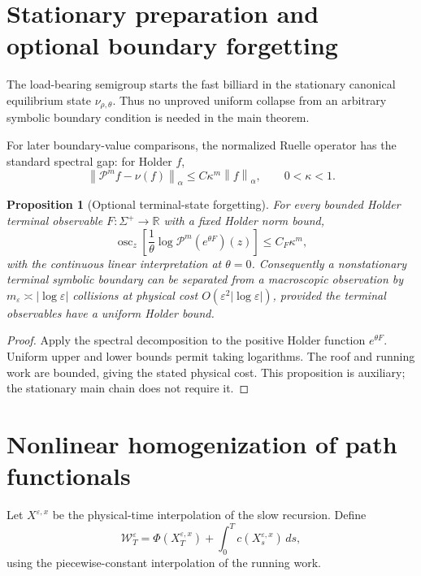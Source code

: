 \documentclass[11pt,reqno]{amsart}
\newtheorem{proposition}[theorem]{Proposition}
\theoremstyle{definition}
\theoremstyle{remark}
\newcommand{\R}{\mathbb R}
\newcommand{\cP}{\mathcal P}
\newcommand{\osc}{\operatorname{osc}}
\newcommand{\norm}[1]{\left\lVert #1\right\rVert}
\begin{document}
\section{Stationary preparation and optional boundary forgetting}\label{sec:fast-collapse}
The load-bearing semigroup starts the fast billiard in the stationary
canonical equilibrium state $\nu_{\rho,\theta}$.  Thus no unproved uniform
collapse from an arbitrary symbolic boundary condition is needed in the main
theorem.

For later boundary-value comparisons, the normalized Ruelle operator has the
standard spectral gap: for Holder $f$,
\[
 \norm{\cP^mf-\nu(f)}_\alpha
 \le C\kappa^m\norm f_\alpha,
 \qquad 0<\kappa<1.
\]

\begin{proposition}[Optional terminal-state forgetting]\label{thm:fast-collapse}
For every bounded Holder terminal observable $F:\Sigma^+\to\R$ with a fixed
Holder norm bound,
\[
 \osc_z\left[\frac1\theta\log\cP^m(e^{\theta F})(z)\right]
 \le C_F\kappa^m,
\]
with the continuous linear interpretation at $\theta=0$.  Consequently a
nonstationary terminal symbolic boundary can be separated from a macroscopic
observation by $m_\varepsilon\asymp|\log\varepsilon|$ collisions at physical
cost $O(\varepsilon^2|\log\varepsilon|)$, provided the terminal observables
have a uniform Holder bound.
\end{proposition}
\begin{proof}
Apply the spectral decomposition to the positive Holder function
$e^{\theta F}$.  Uniform upper and lower bounds permit taking logarithms.  The
roof and running work are bounded, giving the stated physical cost.  This
proposition is auxiliary; the stationary main chain does not require it.
\end{proof}

\section{Nonlinear homogenization of path functionals}\label{sec:nonlinear-hom}
Let $X^{\varepsilon,x}$ be the physical-time interpolation of the slow
recursion.  Define
\[
 \mathcal W_T^\varepsilon
 =\Phi(X_T^{\varepsilon,x})
 +\int_0^Tc(X_s^{\varepsilon,x})\,ds,
\]
using the piecewise-constant interpolation of the running work.
\end{document}
